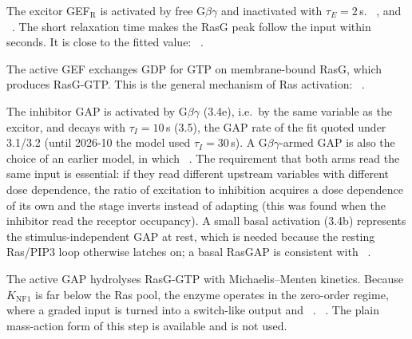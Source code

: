 \begin{description}\itemsep0pt
\item[3.1/3.2] The excitor GEF$_\mathrm{R}$ is activated by free G$\beta\gamma$ and inactivated with $\tau_E=2$\,s. ~\cite{kae2007}, and ~\cite{kortholt2013}. The short relaxation time makes the RasG peak follow the input within seconds. It is close to the fitted value: ~\cite[Suppl.\ Information]{takeda2012}.
\item[3.3] The active GEF exchanges GDP for GTP on membrane-bound RasG, which produces RasG-GTP. This is the general mechanism of Ras activation: ~\cite{kae2004,kae2007,xu2022}.
\item[3.4e/3.4b/3.5] The inhibitor GAP is activated by G$\beta\gamma$ (3.4e), i.e.\ by the same variable as the excitor, and decays with $\tau_I=10$\,s (3.5), the GAP rate of the fit quoted under 3.1/3.2 (until 2026-10 the model used $\tau_I=30$\,s). A G$\beta\gamma$-armed GAP is also the choice of an earlier model, in which ~\cite{meierschellersheim2006}. The requirement that both arms read the same input is essential: if they read different upstream variables with different dose dependence, the ratio of excitation to inhibition acquires a dose dependence of its own and the stage inverts instead of adapting (this was found when the inhibitor read the receptor occupancy). A small basal activation (3.4b) represents the stimulus-independent GAP at rest, which is needed because the resting Ras/PIP3 loop otherwise latches on; a basal RasGAP is consistent with ~\cite{zhang2008,xu2021c2gap}.
\item[3.7z] The active GAP hydrolyses RasG-GTP with Michaelis--Menten kinetics. Because $K_\mathrm{NF1}$ is far below the Ras pool, the enzyme operates in the zero-order regime, where a graded input is turned into a switch-like output and ~\cite{nakajima2014}. ~\cite{wiesmuller1992,coyle2016}. The plain mass-action form of this step is available and is not used.

\end{description}
